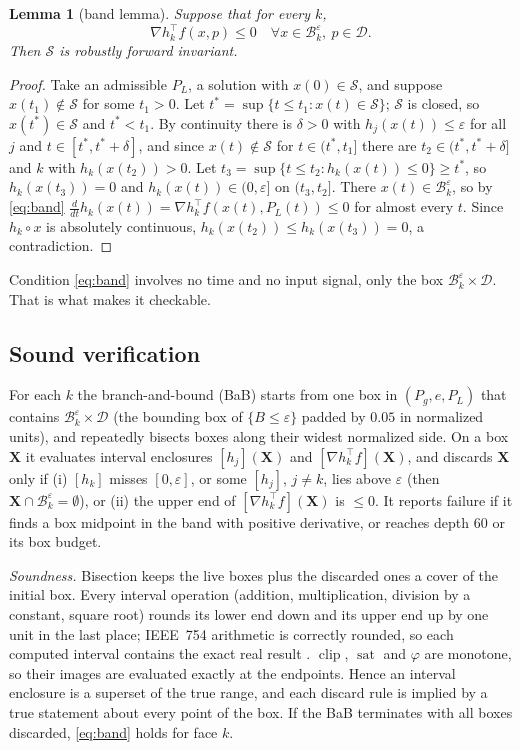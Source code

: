 \documentclass[journal]{IEEEtran}
\newtheorem{lemma}{Lemma}
\theoremstyle{remark}
\newcommand{\clip}{\operatorname{clip}}
\newcommand{\sat}{\operatorname{sat}}
\newcommand{\D}{\mathcal{D}}
\newcommand{\Sset}{\mathcal{S}}
\begin{document}
\begin{lemma}[band lemma]\label{lem:band}
Suppose that for every $k$,
\begin{equation}\label{eq:band}
\nabla h_k^\top f(x,p)\le 0\quad\forall x\in\mathcal{B}_k^\varepsilon,\ p\in\D.
\end{equation}
Then $\Sset$ is robustly forward invariant.
\end{lemma}
\begin{proof}
Take an admissible $P_L$, a solution with $x(0)\in\Sset$, and suppose $x(t_1)\notin\Sset$ for some $t_1>0$. Let
$t^\ast=\sup\{t\le t_1: x(t)\in\Sset\}$; $\Sset$ is closed, so $x(t^\ast)\in\Sset$ and $t^\ast<t_1$. By continuity
there is $\delta>0$ with $h_j(x(t))\le\varepsilon$ for all $j$ and $t\in[t^\ast,t^\ast+\delta]$, and since
$x(t)\notin\Sset$ for $t\in(t^\ast,t_1]$ there are $t_2\in(t^\ast,t^\ast+\delta]$ and $k$ with
$h_k(x(t_2))>0$. Let $t_3=\sup\{t\le t_2:h_k(x(t))\le0\}\ge t^\ast$, so $h_k(x(t_3))=0$ and
$h_k(x(t))\in(0,\varepsilon]$ on $(t_3,t_2]$. There $x(t)\in\mathcal{B}_k^\varepsilon$, so by \eqref{eq:band}
$\frac{d}{dt}h_k(x(t))=\nabla h_k^\top f(x(t),P_L(t))\le 0$ for almost every $t$. Since $h_k\circ x$ is absolutely
continuous, $h_k(x(t_2))\le h_k(x(t_3))=0$, a contradiction.
\end{proof}

Condition \eqref{eq:band} involves no time and no input signal, only the box $\mathcal{B}_k^\varepsilon\times\D$.
That is what makes it checkable.

\subsection{Sound verification}
For each $k$ the branch-and-bound (BaB) starts from one box in $(P_g,e,P_L)$ that contains
$\mathcal{B}_k^\varepsilon\times\D$ (the bounding box of $\{B\le\varepsilon\}$ padded by $0.05$ in normalized units),
and repeatedly bisects boxes along their widest normalized side. On a box $\mathbf{X}$ it evaluates interval
enclosures $[h_j](\mathbf{X})$ and $[\nabla h_k^\top f](\mathbf{X})$, and discards $\mathbf{X}$ only if
(i) $[h_k]$ misses $[0,\varepsilon]$, or some $[h_j]$, $j\ne k$, lies above $\varepsilon$ (then
$\mathbf{X}\cap\mathcal{B}_k^\varepsilon=\emptyset$), or (ii) the upper end of $[\nabla h_k^\top f](\mathbf{X})$ is
$\le 0$. It reports failure if it finds a box midpoint in the band with positive derivative, or reaches depth
$60$ or its box budget.

\emph{Soundness.} Bisection keeps the live boxes plus the discarded ones a cover of the initial box. Every interval
operation (addition, multiplication, division by a constant, square root) rounds its lower end down and its upper end
up by one unit in the last place; IEEE~754 arithmetic is correctly rounded, so each computed interval contains the
exact real result \cite{moore2009}. $\clip$, $\sat$ and $\varphi$ are monotone, so their images are evaluated
exactly at the endpoints. Hence an interval enclosure is a superset of the true range, and each discard rule is
implied by a true statement about every point of the box. If the BaB terminates with all boxes discarded,
\eqref{eq:band} holds for face $k$.
\end{document}
